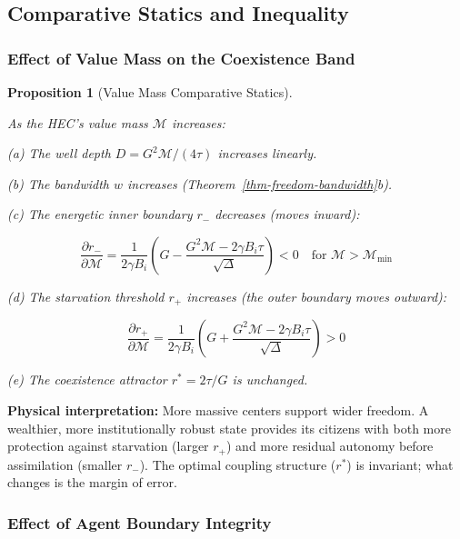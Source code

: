 \documentclass[11pt]{article}
\theoremstyle{plain}
\newtheorem{proposition}[theorem]{Proposition}
\theoremstyle{definition}
\theoremstyle{remark}
\let\origsubsection\subsection
\renewcommand{\subsection}{\needspace{7\baselineskip}\origsubsection}
\let\origsubsubsection\subsubsection
\renewcommand{\subsubsection}{\needspace{4\baselineskip}\origsubsubsection}
\begin{document}
\subsection{Comparative Statics and
Inequality}\label{comparative-statics-and-inequality}

\subsubsection{Effect of Value Mass on the Coexistence
Band}\label{effect-of-value-mass-on-the-coexistence-band}

\begin{proposition}[Value Mass Comparative Statics]
\label{prop-value-mass-comparative-statics}

As the HEC's value mass $\mathcal{M}$ increases:

(a) The well depth $D = G^2\mathcal{M}/(4\tau)$ increases linearly.

(b) The bandwidth $w$ increases (Theorem~\ref{thm-freedom-bandwidth}b).

(c) The energetic inner boundary $r_-$ decreases (moves inward):

$$\frac{\partial r_-}{\partial \mathcal{M}} = \frac{1}{2\gamma B_i}\left(G - \frac{G^2\mathcal{M} - 2\gamma B_i \tau}{\sqrt{\Delta}}\right) < 0 \quad \text{for } \mathcal{M} > \mathcal{M}_{\min}$$

(d) The starvation threshold $r_+$ increases (the outer boundary moves outward):

$$\frac{\partial r_+}{\partial \mathcal{M}} = \frac{1}{2\gamma B_i}\left(G + \frac{G^2\mathcal{M} - 2\gamma B_i \tau}{\sqrt{\Delta}}\right) > 0$$

(e) The coexistence attractor $r^* = 2\tau/G$ is unchanged.
\end{proposition}

\textbf{Physical interpretation:} More massive centers support wider
freedom. A wealthier, more institutionally robust state provides its
citizens with both more protection against starvation (larger \(r_+\))
and more residual autonomy before assimilation (smaller \(r_-\)). The
optimal coupling structure (\(r^*\)) is invariant; what changes is the
margin of error.

\subsubsection{Effect of Agent Boundary
Integrity}\label{effect-of-agent-boundary-integrity}
\end{document}
